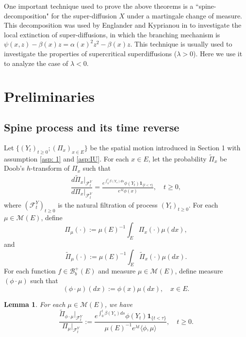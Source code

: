 \documentclass[12pt,a4paper]{amsart}
\theoremstyle{plain}
\newtheorem{lem}[thm]{Lemma}
\theoremstyle{definition}
\numberwithin{equation}{section}
\begin{document}
	One important technique used to prove the above theorems is a ``spine-decomposition" for the super-diffusion $X$ under a martingale change of measure. This decomposition was used by Englander and Kyprianou in \cite{EnglanderKyprianou2004Local} to investigate the local extinction of super-diffusions,
	in which the branching mechanism is $\psi(x,z)-\beta(x)z=\alpha(x)^2z^2-\beta(x)z$. 	
	This technique is usually used to investigate the properties of supercritical superdiffusions ($\lambda>0$).
	Here we use it to analyze the case of $\lambda<0$.


\section{Preliminaries}
\subsection{Spine process and its time reverse}
	Let $\{(Y_t)_{t\geq 0}; (\Pi_x)_{x\in E}\}$ be the spatial motion introduced in Section 1 with assumption \ref{asp: 1} and \ref{asp:IU}.
	For each $x\in E$,
	let the probability $\widetilde \Pi_{x}$ be Doob's $h$-transform of $\Pi_x$ such that
\begin{align}
	\dfrac{d\widetilde{\Pi}_x|_{\mathscr F^Y_t}}{d\Pi_x|_{\mathscr F^Y_t}}= \frac{e^{\int_0^t \beta(Y_s)ds}\phi(Y_t) \mathbf 1_{\{t<\tau\}}}{e^{\lambda t}\phi(x)},
	\quad t\geq 0,
\end{align}
	where $(\mathscr F_t^Y)_{t\geq 0}$ is the natural filtration of process $(Y_t)_{t\geq 0}$. 	For each $\mu \in \mathcal M(E)$, define
\[
	\Pi_{\mu}(\cdot)
	:= \mu(E)^{-1}\int_{E} \Pi_x(\cdot)\mu(dx),
\]
    and
\[
	\tilde\Pi_{\mu}(\cdot):= \mu(E)^{-1} \int_E\tilde\Pi_x(\cdot)\mu(dx).
\]
	For each function $f \in \mathcal B_b^+(E)$ and measure $\mu \in \mathcal M(E)$, define measure $(\phi \cdot\mu)$ such that
\[
    (\phi \cdot \mu)(dx)
    := \phi(x)\mu(dx),
    \quad x\in E.
\]
\begin{lem}
	For each $\mu\in \mathcal M(E)$, we have
\[
	\dfrac{\widetilde \Pi_{\phi\cdot\mu}|_{\mathscr F_t^Y}}{\Pi_{\mu}|_{\mathscr F_t^Y}}
  	:= \frac{e^{\int_0^t \beta(Y_s)ds}\phi(Y_t) \mathbf 1_{\{t<\tau\}}}{\mu(E)^{-1}e^{\lambda t}\langle \phi,\mu\rangle},
  	\quad t\geq 0.
\]
\end{lem}
\end{document}
